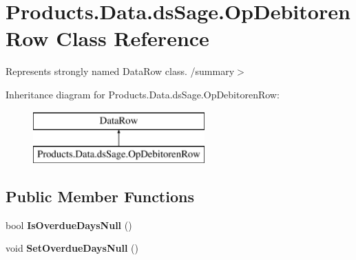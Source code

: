 \hypertarget{class_products_1_1_data_1_1ds_sage_1_1_op_debitoren_row}{}\section{Products.\+Data.\+ds\+Sage.\+Op\+Debitoren\+Row Class Reference}
\label{class_products_1_1_data_1_1ds_sage_1_1_op_debitoren_row}


Represents strongly named Data\+Row class. /summary$>$  


Inheritance diagram for Products.\+Data.\+ds\+Sage.\+Op\+Debitoren\+Row\+:\begin{figure}[H]
\begin{center}
\leavevmode
\includegraphics[height=2.000000cm]{class_products_1_1_data_1_1ds_sage_1_1_op_debitoren_row}
\end{center}
\end{figure}
\subsection*{Public Member Functions}
\begin{DoxyCompactItemize}
\item 
bool {\bfseries Is\+Overdue\+Days\+Null} ()\hypertarget{class_products_1_1_data_1_1ds_sage_1_1_op_debitoren_row_ae5bd5d827280870f36104bc02b7386e5}{}\label{class_products_1_1_data_1_1ds_sage_1_1_op_debitoren_row_ae5bd5d827280870f36104bc02b7386e5}

\item 
void {\bfseries Set\+Overdue\+Days\+Null} ()\hypertarget{class_products_1_1_data_1_1ds_sage_1_1_op_debitoren_row_aa84ecda64357673cc8ac50b9c80730d0}{}\label{class_products_1_1_data_1_1ds_sage_1_1_op_debitoren_row_aa84ecda64357673cc8ac50b9c80730d0}

\end{DoxyCompactItemize}
